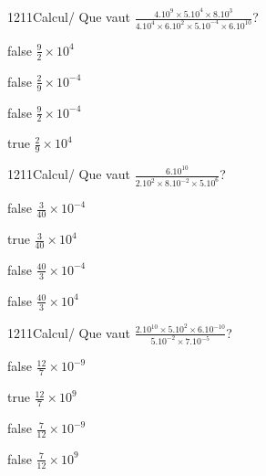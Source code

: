\documentclass[11pt]{article}
\begin{document}
            \begin{question}{1211}{Calcul}{}{/}
                Que vaut $\frac{4.10^{9}\times 5.10^{4}\times 8.10^{3}}{4.10^{4}\times 6.10^{2}\times 5.10^{-4}\times 6.10^{10}}$?
            \end{question}
            
            \begin{reponses}
                \item[false] $\frac{9}{2}\times 10^{4}$
                \item[false] $\frac{2}{9}\times 10^{-4}$
                \item[false] $\frac{9}{2}\times 10^{-4}$
                \item[true] $\frac{2}{9}\times 10^{4}$
            \end{reponses}
            
            \begin{question}{1211}{Calcul}{}{/}
                Que vaut $\frac{6.10^{10}}{2.10^{2}\times 8.10^{-2}\times 5.10^{6}}$?
            \end{question}
            
            \begin{reponses}
                \item[false] $\frac{3}{40}\times 10^{-4}$
                \item[true] $\frac{3}{40}\times 10^{4}$
                \item[false] $\frac{40}{3}\times 10^{-4}$
                \item[false] $\frac{40}{3}\times 10^{4}$
            \end{reponses}
            
            \begin{question}{1211}{Calcul}{}{/}
                Que vaut $\frac{2.10^{10}\times 5.10^{2}\times 6.10^{-10}}{5.10^{-2}\times 7.10^{-5}}$?
            \end{question}
            
            \begin{reponses}
                \item[false] $\frac{12}{7}\times 10^{-9}$
                \item[true] $\frac{12}{7}\times 10^{9}$
                \item[false] $\frac{7}{12}\times 10^{-9}$
                \item[false] $\frac{7}{12}\times 10^{9}$
            \end{reponses}
            
\end{document}
